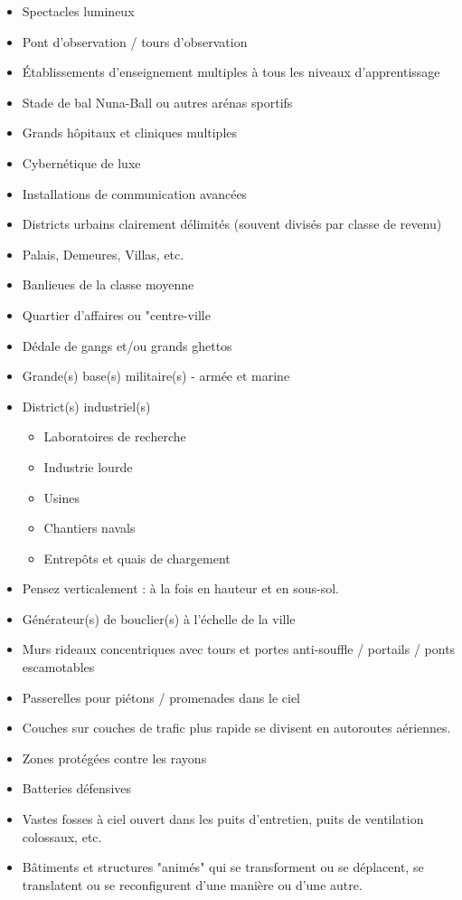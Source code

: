 \documentclass{article}
\begin{document}
\begin{multicols}{2}
\begin{itemize}
		\item Spectacles lumineux
		\item Pont d'observation / tours d'observation
		\item Établissements d'enseignement multiples à tous les niveaux d'apprentissage
		\item Stade de bal Nuna-Ball ou autres arénas sportifs
		\item Grands hôpitaux et cliniques multiples
		\item Cybernétique de luxe
		\item Installations de communication avancées
		\item Districts urbains clairement délimités (souvent divisés par classe de revenu)
		\item Palais, Demeures, Villas, etc.
		\item Banlieues de la classe moyenne
		\item Quartier d'affaires ou "centre-ville
		\item Dédale de gangs et/ou grands ghettos
		\item Grande(s) base(s) militaire(s) - armée et marine
		\item District(s) industriel(s)
		\begin{itemize}
			\item Laboratoires de recherche
			\item Industrie lourde
			\item Usines
			\item Chantiers navals
			\item Entrepôts et quais de chargement
		\end{itemize}
		\item Pensez verticalement : à la fois en hauteur et en sous-sol.
		\item Générateur(s) de bouclier(s) à l'échelle de la ville
		\item Murs rideaux concentriques avec tours et portes anti-souffle / portails / ponts escamotables
		\item Passerelles pour piétons / promenades dans le ciel
		\item Couches sur couches de trafic plus rapide se divisent en autoroutes aériennes.
		\item Zones protégées contre les rayons
		\item Batteries défensives
		\item Vastes fosses à ciel ouvert dans les puits d'entretien, puits de ventilation colossaux, etc.
		\item Bâtiments et structures "animés" qui se transforment ou se déplacent, se translatent ou se reconfigurent d'une manière ou d'une autre.
		
	\end{itemize}
\end{multicols}
\end{document}

